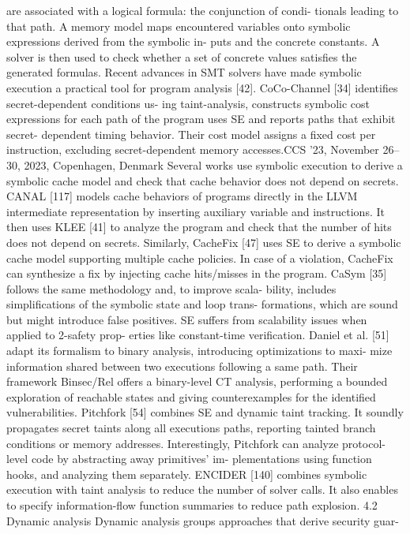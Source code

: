 are associated with a logical formula: the conjunction of condi-
tionals leading to that path. A memory model maps encountered
variables onto symbolic expressions derived from the symbolic in-
puts and the concrete constants. A solver is then used to check
whether a set of concrete values satisfies the generated formulas.
Recent advances in SMT solvers have made symbolic execution a
practical tool for program analysis [42].
CoCo-Channel [34] identifies secret-dependent conditions us-
ing taint-analysis, constructs symbolic cost expressions for each
path of the program uses SE and reports paths that exhibit secret-
dependent timing behavior. Their cost model assigns a fixed cost
per instruction, excluding secret-dependent memory accesses.CCS ’23, November 26–30, 2023, Copenhagen, Denmark
Several works use symbolic execution to derive a symbolic cache
model and check that cache behavior does not depend on secrets.
CANAL [117] models cache behaviors of programs directly in the
LLVM intermediate representation by inserting auxiliary variable
and instructions. It then uses KLEE [41] to analyze the program
and check that the number of hits does not depend on secrets.
Similarly, CacheFix [47] uses SE to derive a symbolic cache model
supporting multiple cache policies. In case of a violation, CacheFix
can synthesize a fix by injecting cache hits/misses in the program.
CaSym [35] follows the same methodology and, to improve scala-
bility, includes simplifications of the symbolic state and loop trans-
formations, which are sound but might introduce false positives.
SE suffers from scalability issues when applied to 2-safety prop-
erties like constant-time verification. Daniel et al. [51] adapt its
formalism to binary analysis, introducing optimizations to maxi-
mize information shared between two executions following a same
path. Their framework Binsec/Rel offers a binary-level CT analysis,
performing a bounded exploration of reachable states and giving
counterexamples for the identified vulnerabilities.
Pitchfork [54] combines SE and dynamic taint tracking. It soundly
propagates secret taints along all executions paths, reporting tainted
branch conditions or memory addresses. Interestingly, Pitchfork
can analyze protocol-level code by abstracting away primitives’ im-
plementations using function hooks, and analyzing them separately.
ENCIDER [140] combines symbolic execution with taint analysis
to reduce the number of solver calls. It also enables to specify
information-flow function summaries to reduce path explosion.
4.2
Dynamic analysis
Dynamic analysis groups approaches that derive security guar-
